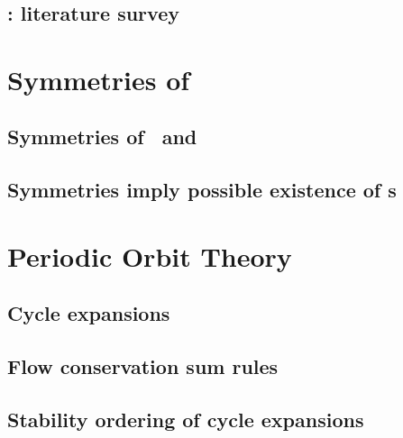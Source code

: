 \documentclass[hyperref]{inputs/gatech-thesis}
\begin{document}
\chapter{\KSe}
\label{chap:pCf}

    \section{\KS: literature survey}
        \label{sec:KSlit}
        

\chapter{\KSe}
\label{chap:KSe}
%    

\chapter{Symmetries of \KS}
\label{chap:Symmetry}

    \section{Symmetries of \eqva\ and \reqva}

    \section{Symmetries imply possible existence of \rpo s}
        \label{sec:SymRPO}
        

\chapter{Periodic Orbit Theory}
\label{chap:POT}

    \section{Cycle expansions}
        \label{sec:cycExp}
        

    \section{Flow conservation sum rules}
        \label{s-Cons-m-flow}
        

    \section{Stability ordering of cycle expansions}
        \label{s-StabOrd}
        
\end{document}

